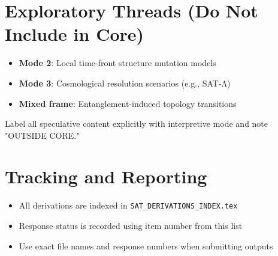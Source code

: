 \documentclass[12pt]{article}
\begin{document}
\section*{Exploratory Threads (Do Not Include in Core)}

\begin{itemize}
    \item \textbf{Mode 2}: Local time-front structure mutation models
    \item \textbf{Mode 3}: Cosmological resolution scenarios (e.g., SAT-Λ)
    \item \textbf{Mixed frame}: Entanglement-induced topology transitions
\end{itemize}

Label all speculative content explicitly with interpretive mode and note "OUTSIDE CORE."

\section*{Tracking and Reporting}

\begin{itemize}
    \item All derivations are indexed in \texttt{SAT\_DERIVATIONS\_INDEX.tex}
    \item Response status is recorded using item number from this list
    \item Use exact file names and response numbers when submitting outputs
\end{itemize}
\end{document}
